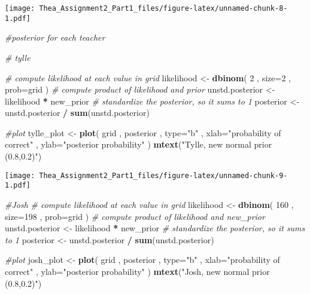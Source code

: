 \documentclass[]{article}
\newenvironment{Shaded}{\begin{snugshade}}{\end{snugshade}}
\newcommand{\KeywordTok}[1]{\textcolor[rgb]{0.13,0.29,0.53}{\textbf{#1}}}
\newcommand{\DataTypeTok}[1]{\textcolor[rgb]{0.13,0.29,0.53}{#1}}
\newcommand{\DecValTok}[1]{\textcolor[rgb]{0.00,0.00,0.81}{#1}}
\newcommand{\StringTok}[1]{\textcolor[rgb]{0.31,0.60,0.02}{#1}}
\newcommand{\CommentTok}[1]{\textcolor[rgb]{0.56,0.35,0.01}{\textit{#1}}}
\newcommand{\OperatorTok}[1]{\textcolor[rgb]{0.81,0.36,0.00}{\textbf{#1}}}
\newcommand{\NormalTok}[1]{#1}
\begin{document}
\texttt{[image: Thea\_Assignment2\_Part1\_files/figure-latex/unnamed-chunk-8-1.pdf]}

\begin{Shaded}
\begin{Highlighting}[]
\CommentTok{#posterior for each teacher}

\CommentTok{# tylle}

\CommentTok{# compute likelihood at each value in grid}
\NormalTok{likelihood <-}\StringTok{ }\KeywordTok{dbinom}\NormalTok{( }\DecValTok{2}\NormalTok{ , }\DataTypeTok{size=}\DecValTok{2}\NormalTok{ , }\DataTypeTok{prob=}\NormalTok{grid )}
\CommentTok{# compute product of likelihood and prior}
\NormalTok{unstd.posterior <-}\StringTok{ }\NormalTok{likelihood }\OperatorTok{*}\StringTok{ }\NormalTok{new_prior}
\CommentTok{# standardize the posterior, so it sums to 1}
\NormalTok{posterior <-}\StringTok{ }\NormalTok{unstd.posterior }\OperatorTok{/}\StringTok{ }\KeywordTok{sum}\NormalTok{(unstd.posterior)}

\CommentTok{#plot}
\NormalTok{tylle_plot <-}\StringTok{ }\KeywordTok{plot}\NormalTok{( grid , posterior , }\DataTypeTok{type=}\StringTok{"b"}\NormalTok{ ,}
    \DataTypeTok{xlab=}\StringTok{"probability of correct"}\NormalTok{ , }\DataTypeTok{ylab=}\StringTok{"posterior probability"}\NormalTok{ )}
\KeywordTok{mtext}\NormalTok{(}\StringTok{"Tylle, new normal prior (0.8,0.2)"}\NormalTok{)}
\end{Highlighting}
\end{Shaded}

\texttt{[image: Thea\_Assignment2\_Part1\_files/figure-latex/unnamed-chunk-9-1.pdf]}

\begin{Shaded}
\begin{Highlighting}[]
\CommentTok{#Josh}
\CommentTok{# compute likelihood at each value in grid}
\NormalTok{likelihood <-}\StringTok{ }\KeywordTok{dbinom}\NormalTok{( }\DecValTok{160}\NormalTok{ , }\DataTypeTok{size=}\DecValTok{198}\NormalTok{ , }\DataTypeTok{prob=}\NormalTok{grid )}
\CommentTok{# compute product of likelihood and new_prior}
\NormalTok{unstd.posterior <-}\StringTok{ }\NormalTok{likelihood }\OperatorTok{*}\StringTok{ }\NormalTok{new_prior}
\CommentTok{# standardize the posterior, so it sums to 1}
\NormalTok{posterior <-}\StringTok{ }\NormalTok{unstd.posterior }\OperatorTok{/}\StringTok{ }\KeywordTok{sum}\NormalTok{(unstd.posterior)}

\CommentTok{#plot}
\NormalTok{josh_plot <-}\StringTok{ }\KeywordTok{plot}\NormalTok{( grid , posterior , }\DataTypeTok{type=}\StringTok{"b"}\NormalTok{ ,}
    \DataTypeTok{xlab=}\StringTok{"probability of correct"}\NormalTok{ , }\DataTypeTok{ylab=}\StringTok{"posterior probability"}\NormalTok{ )}
\KeywordTok{mtext}\NormalTok{(}\StringTok{"Josh, new normal prior (0.8,0.2)"}\NormalTok{)}
\end{Highlighting}
\end{Shaded}
\end{document}
